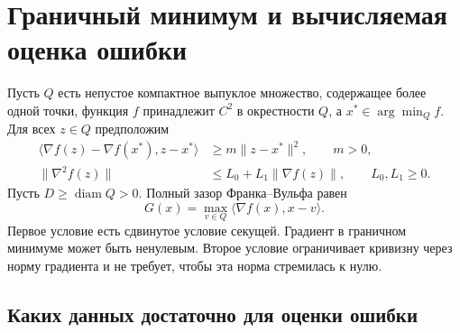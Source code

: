 \section{Граничный минимум и вычисляемая оценка ошибки}
\label{sec:boundary-gradient-model}

Пусть $Q$ есть непустое компактное выпуклое множество, содержащее
более одной точки, функция $f$ принадлежит $C^2$ в окрестности $Q$,
а $x^*\in\arg\min_Q f$. Для всех $z\in Q$ предположим
\begin{equation}\label{eq:boundary-gradient-assumptions}
\begin{aligned}
 \langle\nabla f(z)-\nabla f(x^*),z-x^*\rangle
    &\ge m\|z-x^*\|^2,\qquad m>0,\\
 \|\nabla^2 f(z)\|&\le L_0+L_1\|\nabla f(z)\|,
       \qquad L_0,L_1\ge0.
\end{aligned}
\end{equation}
Пусть $D\ge\operatorname{diam}Q>0$. Полный зазор Франка--Вульфа равен
\[
 G(x)=\max_{v\in Q}\langle\nabla f(x),x-v\rangle.
\]
Первое условие есть сдвинутое условие секущей. Градиент в граничном
минимуме может быть ненулевым. Второе условие ограничивает кривизну
через норму градиента и не требует, чтобы эта норма стремилась к нулю.

\subsection{Каких данных достаточно для оценки ошибки}

